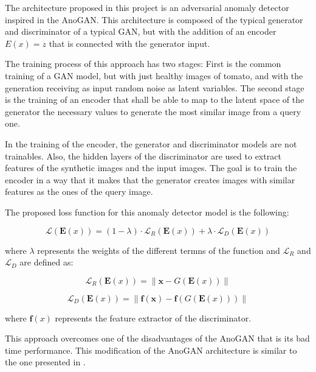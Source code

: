 The architecture proposed in this project is an adversarial anomaly detector inspired in the AnoGAN. This architecture is composed of the typical generator and discriminator of a typical GAN, but with the addition of an encoder \begin{math}E(x) = z\end{math} that is connected with the generator input.

The training process of this approach has two stages: First is the common training of a GAN model, but with just healthy images of tomato, and with the generation receiving as input random noise as latent variables. The second stage is the training of an encoder that shall be able to map to the latent space of the generator the necessary values to generate the most similar image from a query one.

In the training of the encoder, the generator and discriminator models are not trainables. Also, the hidden layers of the discriminator are used to extract features of the synthetic images and the input images. The goal is to train the encoder in a way that it makes that the generator creates images with similar features as the ones of the query image.

The proposed loss function for this anomaly detector model is the following:

\begin{equation}
 \mathcal{L}\left(\mathbf{E}(x)\right)=(1-\lambda) \cdot \mathcal{L}_{R}\left(\mathbf{E}(x)\right)+\lambda \cdot \mathcal{L}_{D}\left(\mathbf{E}(x)\right)
\end{equation}

where \begin{math}\lambda\end{math} represents the weights of the different termns of the function and \begin{math}\mathcal{L}_{R}\end{math} and \begin{math}\mathcal{L}_{D}\end{math} are defined as:

\begin{equation}
 \mathcal{L}_{R}\left(\mathbf{E}(x)\right)=\left\|\mathbf{x}-G\left(\mathbf{E}(x)\right)\right\|
\end{equation}

\begin{equation}
 \mathcal{L}_{D}\left(\mathbf{E}(x)\right)=\left\|\mathbf{f}(\mathbf{x})-\mathbf{f}\left(G\left(\mathbf{E}(x)\right)\right)\right\|
\end{equation}

where \begin{math}\mathbf{f}(x)\end{math} represents the feature extractor of the discriminator.

This approach overcomes one of the disadvantages of the AnoGAN that is its bad time performance. This modification of the AnoGAN architecture is similar to the one presented in \cite{Schlegl2019}.
